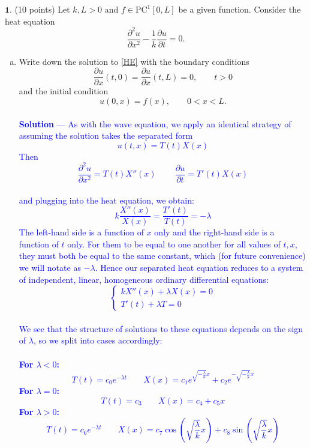 \documentclass[12pt]{article}
\begin{document}
\noindent $\textbf{1}$. (10 points) Let $k, L > 0$ and $f \in \mathrm{PC}^1[0,L]$ be a given function. Consider the heat equation
\begin{equation}
\label{HE}
\tag{HE}
\frac{\partial^2 u}{\partial x^2} - \frac{1}{k}\frac{\partial u}{\partial t}= 0.
\end{equation}
%
\begin{enumerate}[(a)]
\item Write down the solution to \eqref{HE} with the boundary conditions
$$\frac{\partial u}{\partial x}(t,0) = \frac{\partial u}{\partial x}(t,L) =0 , \qquad t > 0$$
and the initial condition
$$ u(0,x) = f(x), \qquad 0 < x < L.$$ \\
\textcolor{blue}{\textbf{Solution} — As with the wave equation, we apply an identical strategy of assuming the solution takes the separated form $$u(t,x) = T(t)X(x)$$ Then $$\frac{\partial^2 u}{\partial x^2} = T(t)X''(x) \;\;\;\;\;\;\;\; \frac{\partial u}{\partial t} = T'(t)X(x)$$ \\ and plugging into the heat equation, we obtain: \\ $$k\frac{X''(x)}{X(x)} = \frac{T'(t)}{T(t)} = -\lambda$$ The left-hand side is a function of $x$ only and the right-hand side is a function of $t$ only. For them to be equal to one another for all values of $t,x$, they must both be equal to the same constant, which (for future convenience) we will notate as $-\lambda$. Hence our separated heat equation reduces to a system of independent, linear, homogeneous ordinary differential equations:
$$\begin{cases}
kX''(x) + \lambda X(x) = 0 \\
T'(t) + \lambda T = 0
\end{cases}$$\\
We see that the structure of solutions to these equations depends on the sign of $\lambda$, so we split into cases accordingly: \\ \\
\textbf{For $\lambda < 0$:} \\
$$T(t) = c_0 e^{-\lambda t} \;\;\;\;\;\;\; X(x) = c_1 e^{\sqrt{-\frac{\lambda}{k}} x} + c_2 e^{-\sqrt{-\frac{\lambda}{k}} x}$$
\textbf{For $\lambda = 0$:} \\
$$T(t) = c_3 \;\;\;\;\;\;\;  X(x) = c_4 + c_5x$$
\textbf{For $\lambda > 0$:} \\ 
$$T(t) = c_6 e^{-\lambda t} \;\;\;\;\;\;\; X(x) = c_7 \cos \left( \sqrt{\frac{\lambda}{k}} x \right) + c_8 \sin \left( \sqrt{\frac{\lambda}{k}} x \right)$$ \\ \\
}
\end{enumerate}
\end{document}
